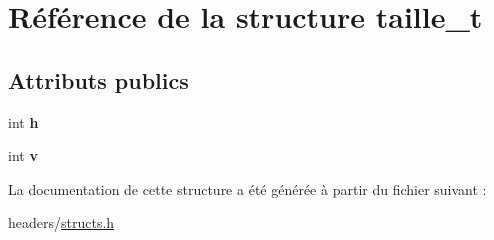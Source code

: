 \hypertarget{structtaille__t}{}\section{Référence de la structure taille\+\_\+t}
\label{structtaille__t}
\subsection*{Attributs publics}
\begin{DoxyCompactItemize}
\item 
\mbox{\label{structtaille__t_a1ad88b6b13694e0db49ae9c57a989682}} 
int {\bfseries h}
\item 
\mbox{\label{structtaille__t_a06d185f0cafdbdba37c263c9737b1de9}} 
int {\bfseries v}
\end{DoxyCompactItemize}


La documentation de cette structure a été générée à partir du fichier suivant \+:\begin{DoxyCompactItemize}
\item 
headers/\hyperlink{structs_8h}{structs.\+h}\end{DoxyCompactItemize}
